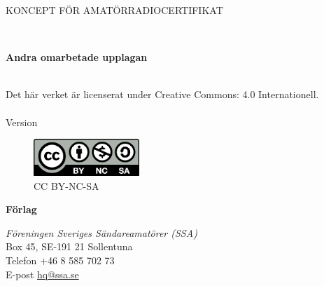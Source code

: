 \vspace{10em}

\begin{center}
\Large{KONCEPT FÖR AMATÖRRADIOCERTIFIKAT}

\\[2\baselineskip]
\end{center}


\noindent \textbf{Andra omarbetade upplagan}

\noindent
\\
\noindent Det här verket är licenserat under Creative Commons:\newline
\noindent{} 4.0 Internationell.
\\
\\
\noindent Version \revision

\begin{figure}
    \includegraphics[width=4cm]{images/cc-by-nc-sa}
    \caption*{CC BY-NC-SA}
\end{figure}


\vfill

\noindent
\textbf{Förlag}

\noindent
\textit{Föreningen Sveriges Sändareamatörer (SSA)}\\
Box 45, SE-191 21 Sollentuna\\
Telefon +46 8 585 702 73\\
E-post \href{mailto:hq@ssa.se}{hq@ssa.se}\\[\baselineskip]